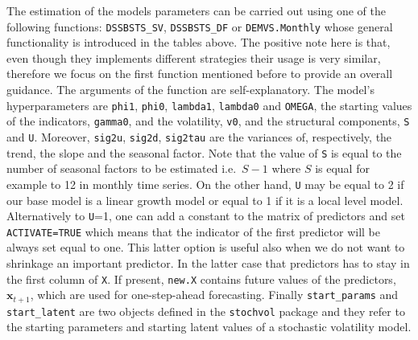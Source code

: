 \documentclass[
  12pt,
]{book}
\newenvironment{Shaded}{\begin{snugshade}}{\end{snugshade}}
\newcommand{\AttributeTok}[1]{\textcolor[rgb]{0.77,0.63,0.00}{#1}}
\newcommand{\DecValTok}[1]{\textcolor[rgb]{0.00,0.00,0.81}{#1}}
\newcommand{\FloatTok}[1]{\textcolor[rgb]{0.00,0.00,0.81}{#1}}
\newcommand{\FunctionTok}[1]{\textcolor[rgb]{0.00,0.00,0.00}{#1}}
\newcommand{\NormalTok}[1]{#1}
\newcommand{\OtherTok}[1]{\textcolor[rgb]{0.56,0.35,0.01}{#1}}
\newcommand{\SpecialCharTok}[1]{\textcolor[rgb]{0.00,0.00,0.00}{#1}}
\theoremstyle{break}
\theoremstyle{nonumberplain}
\begin{document}
\begin{Shaded}
\end{Shaded}

The estimation of the models parameters can be carried out using one of
the following functions: \texttt{DSSBSTS\_SV}, \texttt{DSSBSTS\_DF} or
\texttt{DEMVS.Monthly} whose general functionality is introduced in the
tables above. The positive note here is that, even though they
implements different strategies their usage is very similar, therefore
we focus on the first function mentioned before to provide an overall
guidance. The arguments of the function are self-explanatory. The
model's hyperparameters are \texttt{phi1}, \texttt{phi0},
\texttt{lambda1}, \texttt{lambda0} and \texttt{OMEGA}, the starting
values of the indicators, \texttt{gamma0}, and the volatility,
\texttt{v0}, and the structural components, \texttt{S} and \texttt{U}.
Moreover, \texttt{sig2u}, \texttt{sig2d}, \texttt{sig2tau} are the
variances of, respectively, the trend, the slope and the seasonal
factor. Note that the value of \texttt{S} is equal to the number of
seasonal factors to be estimated i.e.~\(S-1\) where \(S\) is equal for
example to 12 in monthly time series. On the other hand, \texttt{U} may
be equal to 2 if our base model is a linear growth model or equal to 1
if it is a local level model. Alternatively to \texttt{U}=1, one can add
a constant to the matrix of predictors and set \texttt{ACTIVATE=TRUE}
which means that the indicator of the first predictor will be always set
equal to one. This latter option is useful also when we do not want to
shrinkage an important predictor. In the latter case that predictors has
to stay in the first column of \texttt{X}. If present, \texttt{new.X}
contains future values of the predictors, \(\boldsymbol{x}_{t+1}\),
which are used for one-step-ahead forecasting. Finally
\texttt{start\_params} and \texttt{start\_latent} are two objects
defined in the \texttt{stochvol} package and they refer to the starting
parameters and starting latent values of a stochastic volatility model.
\end{document}
